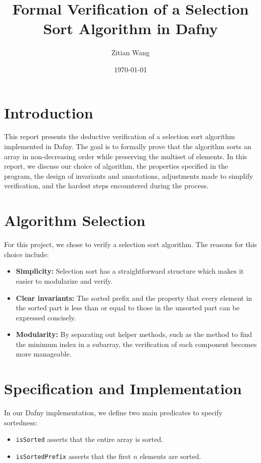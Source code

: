 \documentclass[11pt]{article}
\title{Formal Verification of a Selection Sort Algorithm in Dafny}
\author{Zitian Wang}
\date{\today}
\begin{document}
\maketitle

\section{Introduction}
This report presents the deductive verification of a selection sort algorithm implemented in Dafny. The goal is to formally prove that the algorithm sorts an array in non-decreasing order while preserving the multiset of elements. In this report, we discuss our choice of algorithm, the properties specified in the program, the design of invariants and annotations, adjustments made to simplify verification, and the hardest steps encountered during the process.

\section{Algorithm Selection}
For this project, we chose to verify a selection sort algorithm. The reasons for this choice include:
\begin{itemize}
    \item \textbf{Simplicity:} Selection sort has a straightforward structure which makes it easier to modularize and verify.
    \item \textbf{Clear invariants:} The sorted prefix and the property that every element in the sorted part is less than or equal to those in the unsorted part can be expressed concisely.
    \item \textbf{Modularity:} By separating out helper methods, such as the method to find the minimum index in a subarray, the verification of each component becomes more manageable.
\end{itemize}

\section{Specification and Implementation}
In our Dafny implementation, we define two main predicates to specify sortedness:
\begin{itemize}
    \item \texttt{isSorted} asserts that the entire array is sorted.
    \item \texttt{isSortedPrefix} asserts that the first \( n \) elements are sorted.
\end{itemize}
\end{document}

